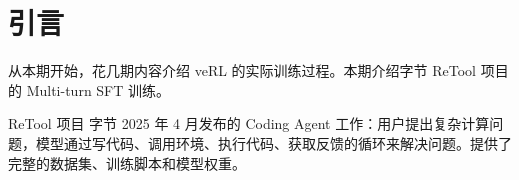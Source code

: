 \section{引言}
从本期开始，花几期内容介绍 veRL 的实际训练过程。本期介绍字节 ReTool 项目的 Multi-turn SFT 训练。

\begin{importantbox}{ReTool 项目}
字节 2025 年 4 月发布的 Coding Agent 工作：用户提出复杂计算问题，模型通过写代码、调用环境、执行代码、获取反馈的循环来解决问题。提供了完整的数据集、训练脚本和模型权重。
\end{importantbox}


